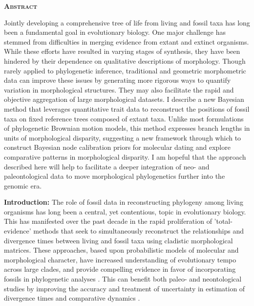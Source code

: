 \documentclass[12pt]{article}
\begin{document}
\noindent \textbf{\textsc{Abstract}}

Jointly developing a comprehensive tree of life  from living and fossil taxa has long been a fundamental goal in evolutionary biology. One major challenge has stemmed from difficulties in merging evidence  from extant and extinct organisms.  While these efforts	 have resulted in varying stages of synthesis, they have been hindered by their dependence on  qualitative descriptions of morphology. Though rarely applied to phylogenetic inference, traditional and geometric morphometric data can improve these issues by generating more rigorous ways to quantify variation in morphological structures. They may also facilitate the rapid and objective aggregation of large morphological datasets. I describe a new Bayesian method that leverages quantitative trait data to reconstruct the positions of fossil taxa on fixed reference trees composed of extant taxa. Unlike most formulations of phylogenetic Brownian motion models, this method expresses branch lengths in units of morphological disparity, suggesting a new framework through which to construct Bayesian node calibration priors for molecular dating and explore comparative patterns in morphological disparity. I am hopeful that the approach described here will help to facilitate a deeper integration of neo- and paleontological data to move morphological phylogenetics further into the genomic era.

\newpage

\noindent\textbf{Introduction:} The role of fossil data in reconstructing
phylogeny among living organisms has long been a central, yet
contentious, topic in evolutionary biology. This has manifested over the past decade
in the rapid proliferation of 'total-evidence' methods that seek to simultaneously reconstruct the relationships
and divergence times between living and fossil taxa using cladistic morphological matrices.
 These approaches, based upon probabilistic models of molecular and
morphological character, have increased understanding of evolutionary tempo across large clades,
and provide compelling evidence in favor of incorporating fossils in
phylogenetic analyses \citep{pyron2011divergence,ronquist2012total}. This can
 benefit both paleo- and neontological studies by improving the accuracy and treatment of
uncertainty in estimation of divergence times and comparative dynamics \citep{slater2012integrating,guindon2018accounting}.
\end{document}
